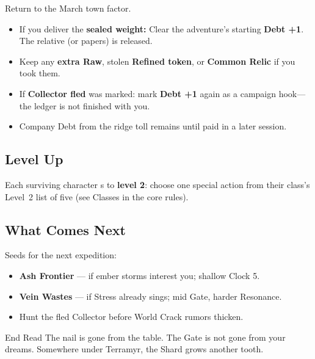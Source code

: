 Return to the March town factor.

\begin{itemize}
    \item If you deliver the \textbf{sealed weight:} Clear the adventure's starting \textbf{Debt +1}. The relative (or papers) is released.
    \item Keep any \textbf{extra Raw}, stolen \textbf{Refined token}, or \textbf{Common Relic} if you took them.
    \item If \textbf{Collector fled} was marked: mark \textbf{Debt +1} again as a campaign hook---the ledger is not finished with you.
    \item Company Debt from the ridge toll remains until paid in a later session.
\end{itemize}

\subsection{Level Up}

Each surviving character s to \textbf{level 2}: choose one special action from their class's Level~2 list of five (see Classes in the core rules).

\subsection{What Comes Next}

Seeds for the next expedition:
\begin{itemize}
    \item \textbf{Ash Frontier} --- if ember storms interest you; shallow Clock 5.
    \item \textbf{Vein Wastes} --- if Stress already sings; mid Gate, harder Resonance.
    \item Hunt the fled Collector before World Crack rumors thicken.
\end{itemize}

\begin{rpgbox}{End Read}
    The nail is gone from the table. The Gate is not gone from your dreams.
    Somewhere under Terramyr, the Shard grows another tooth.
\end{rpgbox}
